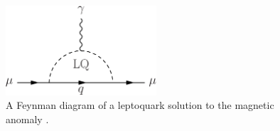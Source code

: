 \begin{figure}[H]
    \centering
    \includegraphics[width=0.5\textwidth]{Images/Theory/Muon_gminus2_LQ.pdf}
    \caption{A Feynman diagram of a leptoquark solution to the magnetic anomaly \amuon.}
    \label{fig:amuLQ}
\end{figure}